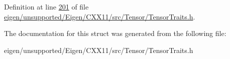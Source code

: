 Definition at line \hyperlink{eigen_2unsupported_2_eigen_2_c_x_x11_2src_2_tensor_2_tensor_traits_8h_source_l00201}{201} of file \hyperlink{eigen_2unsupported_2_eigen_2_c_x_x11_2src_2_tensor_2_tensor_traits_8h_source}{eigen/unsupported/\+Eigen/\+C\+X\+X11/src/\+Tensor/\+Tensor\+Traits.\+h}.



The documentation for this struct was generated from the following file\+:\begin{DoxyCompactItemize}
\item 
eigen/unsupported/\+Eigen/\+C\+X\+X11/src/\+Tensor/\+Tensor\+Traits.\+h\end{DoxyCompactItemize}
